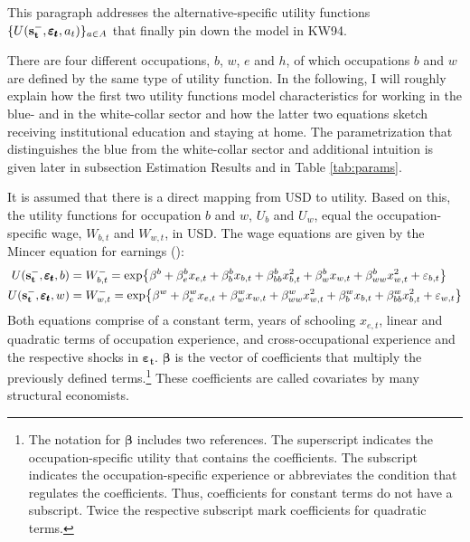 \documentclass[a4paper,12pt]{article}
\begin{document}
\noindent
This paragraph addresses the alternative-specific utility functions $\{U(\bold{s_t^-}, \pmb{\varepsilon_t},a_t)\}_{a \in A}$ that finally pin down the model in KW94.

There are four different occupations, $b$, $w$, $e$ and $h$, of which occupations $b$ and $w$ are defined by the same type of utility function. In the following, I will roughly explain how the first two utility functions model characteristics for working in the blue- and in the white-collar sector and how the latter two equations sketch receiving institutional education and staying at home. The parametrization that distinguishes the blue from the white-collar sector and additional intuition is given later in subsection Estimation Results and in Table \ref{tab:params}.

It is assumed that there is a direct mapping from USD to utility. Based on this, the utility functions for occupation $b$ and $w$, $U_b$ and $U_w$, equal the occupation-specific wage, $W_{b,t}$ and $W_{w,t}$, in USD. The wage equations are given by the Mincer equation for earnings (\cite{Mincer.1958}):
\begin{equation} \label{eq:returns_b_w}
\begin{aligned}
U(\bold{s_t^-}, \pmb{\varepsilon_t},b) &= W_{b,t}^{-} = \text{exp}\big\{\beta^b + \beta_e^b x_{e,t} + \beta_b^b x_{b,t} + \beta_{bb}^b x^2_{b,t} + \beta_w^b x_{w,t} + \beta_{ww}^{b} x^2_{w,t} + \varepsilon_{b,t}\big\} \\
U(\bold{s_t^-},\pmb{\varepsilon_t},w) &= W_{w,t}^{-} = \text{exp}\big\{\beta^w + \beta_e^w x_{e,t} + \beta_w^w x_{w,t} + \beta_{ww}^w x^2_{w,t} + \beta_b^w x_{b,t} + \beta_{bb}^{w} x^2_{b,t} + \varepsilon_{w,t}\big\}
\end{aligned}
\end{equation}
\newline
Both equations comprise of a constant term, years of schooling $x_{e,t}$, linear and quadratic terms of occupation experience, and cross-occupational experience and the  respective shocks in $\pmb{\varepsilon_{t}}$. $\pmb{\beta}$ is the vector of coefficients that multiply the previously defined terms.\footnote{The notation for $\pmb{\beta}$ includes two references. The superscript indicates the occupation-specific utility that contains the coefficients. The subscript indicates the occupation-specific experience or abbreviates the condition that regulates the coefficients. Thus, coefficients for constant terms do not have a subscript. Twice the respective subscript mark coefficients for quadratic terms.} These coefficients are called covariates by many structural economists.
\end{document}
